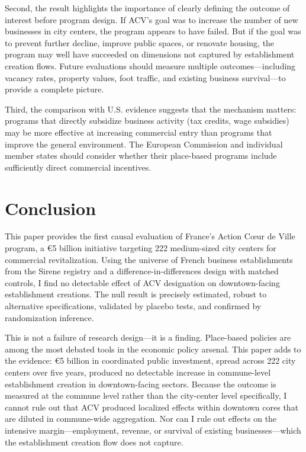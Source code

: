 \documentclass[12pt]{article}
\begin{document}
Second, the result highlights the importance of clearly defining the outcome of interest before program design. If ACV's goal was to increase the number of new businesses in city centers, the program appears to have failed. But if the goal was to prevent further decline, improve public spaces, or renovate housing, the program may well have succeeded on dimensions not captured by establishment creation flows. Future evaluations should measure multiple outcomes---including vacancy rates, property values, foot traffic, and existing business survival---to provide a complete picture.

Third, the comparison with U.S. evidence suggests that the mechanism matters: programs that directly subsidize business activity (tax credits, wage subsidies) may be more effective at increasing commercial entry than programs that improve the general environment. The European Commission and individual member states should consider whether their place-based programs include sufficiently direct commercial incentives.

\section{Conclusion}
\label{sec:conclusion}

This paper provides the first causal evaluation of France's Action C\oe ur de Ville program, a \euro 5 billion initiative targeting 222 medium-sized city centers for commercial revitalization. Using the universe of French business establishments from the Sirene registry and a difference-in-differences design with matched controls, I find no detectable effect of ACV designation on downtown-facing establishment creations. The null result is precisely estimated, robust to alternative specifications, validated by placebo tests, and confirmed by randomization inference.

This is not a failure of research design---it is a finding. Place-based policies are among the most debated tools in the economic policy arsenal. This paper adds to the evidence: \euro 5 billion in coordinated public investment, spread across 222 city centers over five years, produced no detectable increase in commune-level establishment creation in downtown-facing sectors. Because the outcome is measured at the commune level rather than the city-center level specifically, I cannot rule out that ACV produced localized effects within downtown cores that are diluted in commune-wide aggregation. Nor can I rule out effects on the intensive margin---employment, revenue, or survival of existing businesses---which the establishment creation flow does not capture.
\end{document}
